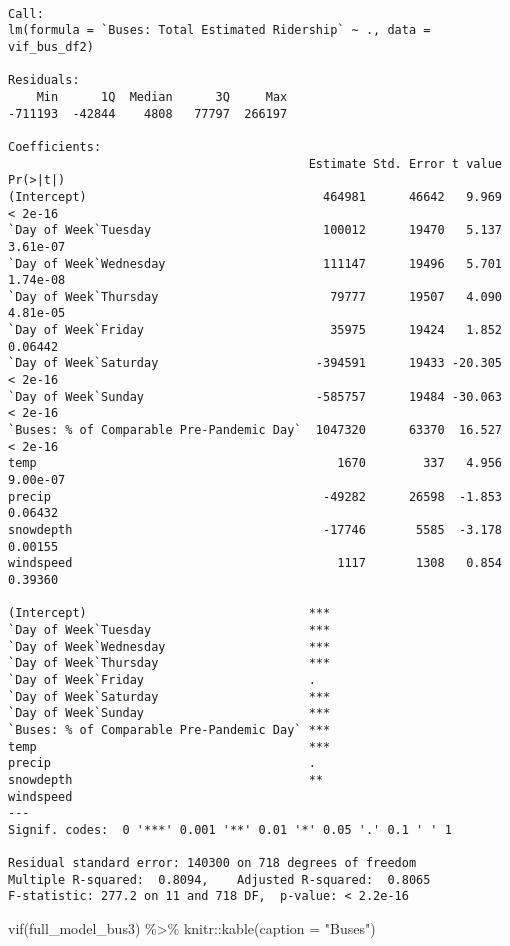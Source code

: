 \documentclass[
  letterpaper,
  DIV=11,
  numbers=noendperiod]{scrartcl}
\newenvironment{Shaded}{\begin{snugshade}}{\end{snugshade}}
\newcommand{\AttributeTok}[1]{\textcolor[rgb]{0.40,0.45,0.13}{#1}}
\newcommand{\FunctionTok}[1]{\textcolor[rgb]{0.28,0.35,0.67}{#1}}
\newcommand{\NormalTok}[1]{\textcolor[rgb]{0.00,0.23,0.31}{#1}}
\newcommand{\SpecialCharTok}[1]{\textcolor[rgb]{0.37,0.37,0.37}{#1}}
\newcommand{\StringTok}[1]{\textcolor[rgb]{0.13,0.47,0.30}{#1}}
\begin{document}
\begin{verbatim}

Call:
lm(formula = `Buses: Total Estimated Ridership` ~ ., data = vif_bus_df2)

Residuals:
    Min      1Q  Median      3Q     Max 
-711193  -42844    4808   77797  266197 

Coefficients:
                                          Estimate Std. Error t value Pr(>|t|)
(Intercept)                                 464981      46642   9.969  < 2e-16
`Day of Week`Tuesday                        100012      19470   5.137 3.61e-07
`Day of Week`Wednesday                      111147      19496   5.701 1.74e-08
`Day of Week`Thursday                        79777      19507   4.090 4.81e-05
`Day of Week`Friday                          35975      19424   1.852  0.06442
`Day of Week`Saturday                      -394591      19433 -20.305  < 2e-16
`Day of Week`Sunday                        -585757      19484 -30.063  < 2e-16
`Buses: % of Comparable Pre-Pandemic Day`  1047320      63370  16.527  < 2e-16
temp                                          1670        337   4.956 9.00e-07
precip                                      -49282      26598  -1.853  0.06432
snowdepth                                   -17746       5585  -3.178  0.00155
windspeed                                     1117       1308   0.854  0.39360
                                             
(Intercept)                               ***
`Day of Week`Tuesday                      ***
`Day of Week`Wednesday                    ***
`Day of Week`Thursday                     ***
`Day of Week`Friday                       .  
`Day of Week`Saturday                     ***
`Day of Week`Sunday                       ***
`Buses: % of Comparable Pre-Pandemic Day` ***
temp                                      ***
precip                                    .  
snowdepth                                 ** 
windspeed                                    
---
Signif. codes:  0 '***' 0.001 '**' 0.01 '*' 0.05 '.' 0.1 ' ' 1

Residual standard error: 140300 on 718 degrees of freedom
Multiple R-squared:  0.8094,    Adjusted R-squared:  0.8065 
F-statistic: 277.2 on 11 and 718 DF,  p-value: < 2.2e-16
\end{verbatim}

\begin{Shaded}
\begin{Highlighting}[]
\FunctionTok{vif}\NormalTok{(full\_model\_bus3) }\SpecialCharTok{\%\textgreater{}\%}\NormalTok{ knitr}\SpecialCharTok{::}\FunctionTok{kable}\NormalTok{(}\AttributeTok{caption =} \StringTok{"Buses"}\NormalTok{)}
\end{Highlighting}
\end{Shaded}
\end{document}
